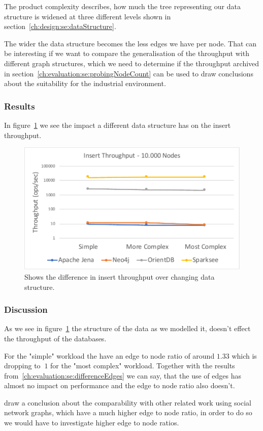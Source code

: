 The product complexity describes,
how much the tree representing our data structure is widened at three different levels shown in section~\ref{ch:design:se:dataStructure}.

The wider the data structure becomes the less edges we have per node.
That can be interesting if we want to compare the generalisation of the throughput with different graph structures,
which we need to determine if the throughput archived in section~\ref{ch:evaluation:se:probingNodeCount} can be used to draw conclusions about the suitability for the industrial environment.

\subsubsection{Results}
In figure~\ref{fig:structure} we see the impact a different data structure has on the insert throughput.

\begin{figure}[h!]
  \centering
  \includegraphics[width=.75\textwidth]{images/production/structure}
  \caption{Shows the difference in insert throughput over changing data structure.}
  \label{fig:structure}
\end{figure}

\subsubsection{Discussion}
As we see in figure~\ref{fig:structure} the structure of the data as we modelled it,
doesn't effect the throughput of the databases.

For the "simple" workload the have an edge to node ratio of around $ 1.33 $ which is dropping to $ ~1 $ for the "most complex" workload.
Together with the results from~\ref{ch:evaluation:se:differenceEdges} we can say,
that the use of edges has almost no impact on performance and the edge to node ratio also doesn't.

 draw a conclusion about the comparability with other related work using social network graphs,
which have a much higher edge to node ratio,
in order to do so we would have to investigate higher edge to node ratios.


